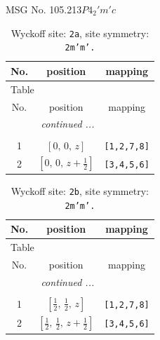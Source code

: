 \documentclass[fleqn,8pt]{jsarticle}
\begin{document}
\setcounter{MaxMatrixCols}{32}

\renewcommand{\tablename}{Table~}
\renewcommand{\figurename}{Figure~}
\begin{center}
\LARGE
MSG No. 105.213\quad$P4_{2}'m'c$
\end{center}
\renewcommand{\arraystretch}{1.2}
\begin{longtable}{ccc}
\caption{Wyckoff site: {\tt 2a}, site symmetry: {\tt 2m'm'.}}
 \\
 \hline \hline
No. & position & mapping \\ \hline \endfirsthead

\multicolumn{2}{l}{\tablename\ \thetable{}} \\
 \hline \hline
No. & position & mapping \\ \hline \endhead

 \hline \hline
\multicolumn{2}{r}{\footnotesize\it continued ...} \\ \endfoot

 \hline \hline
\multicolumn{2}{r}{} \\ \endlastfoot

1 & $\left[ 0,\, 0,\, z \right]$ & {\tt [1,2,7,8]} \\ \hline
2 & $\left[ 0,\, 0,\, z + \frac{1}{2} \right]$ & {\tt [3,4,5,6]} \\
\end{longtable}
\renewcommand{\arraystretch}{1.2}
\begin{longtable}{ccc}
\caption{Wyckoff site: {\tt 2b}, site symmetry: {\tt 2m'm'.}}
 \\
 \hline \hline
No. & position & mapping \\ \hline \endfirsthead

\multicolumn{2}{l}{\tablename\ \thetable{}} \\
 \hline \hline
No. & position & mapping \\ \hline \endhead

 \hline \hline
\multicolumn{2}{r}{\footnotesize\it continued ...} \\ \endfoot

 \hline \hline
\multicolumn{2}{r}{} \\ \endlastfoot

1 & $\left[ \frac{1}{2},\, \frac{1}{2},\, z \right]$ & {\tt [1,2,7,8]} \\ \hline
2 & $\left[ \frac{1}{2},\, \frac{1}{2},\, z + \frac{1}{2} \right]$ & {\tt [3,4,5,6]} \\
\end{longtable}
\end{document}
